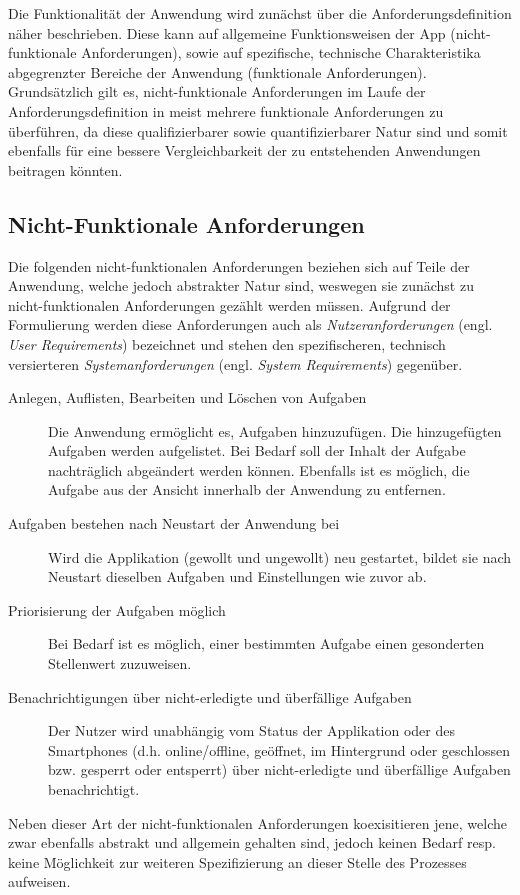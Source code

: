 Die Funktionalität der Anwendung wird zunächst über die Anforderungsdefinition näher beschrieben. Diese kann auf allgemeine Funktionsweisen der App (nicht-funktionale Anforderungen), sowie auf spezifische, technische Charakteristika abgegrenzter Bereiche der Anwendung (funktionale Anforderungen). Grundsätzlich gilt es, nicht-funktionale Anforderungen im Laufe der Anforderungsdefinition in meist mehrere funktionale Anforderungen zu überführen, da diese qualifizierbarer sowie quantifizierbarer Natur sind und somit ebenfalls für eine bessere Vergleichbarkeit der zu entstehenden Anwendungen beitragen könnten.

\subsection{Nicht-Funktionale Anforderungen}
Die folgenden nicht-funktionalen Anforderungen beziehen sich auf Teile der Anwendung, welche jedoch abstrakter Natur sind, weswegen sie zunächst zu nicht-funktionalen Anforderungen gezählt werden müssen. Aufgrund der Formulierung werden diese Anforderungen auch als \textit{Nutzeranforderungen} (engl. \textit{User Requirements}) bezeichnet und stehen den spezifischeren, technisch versierteren \textit{Systemanforderungen} (engl. \textit{System Requirements}) gegenüber.
\begin{description}
    \item[Anlegen, Auflisten, Bearbeiten und Löschen von Aufgaben] Die Anwendung ermöglicht es, Aufgaben hinzuzufügen. Die hinzugefügten Aufgaben werden aufgelistet. Bei Bedarf soll der Inhalt der Aufgabe nachträglich abgeändert werden können. Ebenfalls ist es möglich, die Aufgabe aus der Ansicht innerhalb der Anwendung zu entfernen.
    \item[Aufgaben bestehen nach Neustart der Anwendung bei] Wird die Applikation (gewollt und ungewollt) neu gestartet, bildet sie nach Neustart dieselben Aufgaben und Einstellungen wie zuvor ab.
    \item[Priorisierung der Aufgaben möglich] Bei Bedarf ist es möglich, einer bestimmten Aufgabe einen gesonderten Stellenwert zuzuweisen.
    \item[Benachrichtigungen über nicht-erledigte und überfällige Aufgaben] Der Nutzer wird unabhängig vom Status der Applikation oder des Smartphones (d.h. online/offline, geöffnet, im Hintergrund oder geschlossen bzw. gesperrt oder entsperrt) über nicht-erledigte und überfällige Aufgaben benachrichtigt.
\end{description}
Neben dieser Art der nicht-funktionalen Anforderungen koexisitieren jene, welche zwar ebenfalls abstrakt und allgemein gehalten sind, jedoch keinen Bedarf resp. keine Möglichkeit zur weiteren Spezifizierung an dieser Stelle des Prozesses aufweisen.
